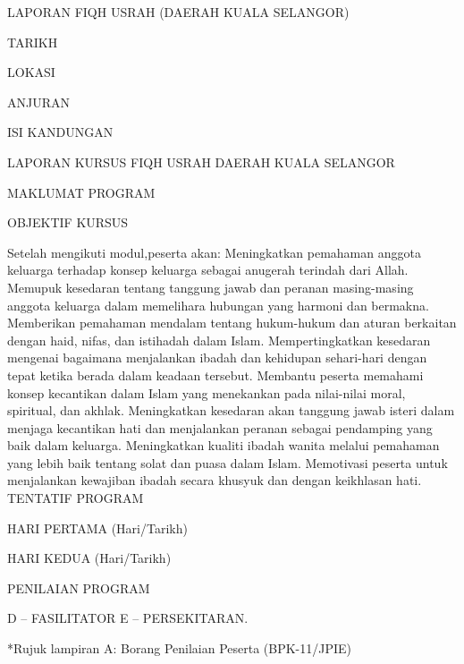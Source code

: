 



LAPORAN FIQH USRAH
(DAERAH KUALA SELANGOR)


TARIKH







LOKASI



ANJURAN

ISI KANDUNGAN


LAPORAN KURSUS FIQH USRAH DAERAH KUALA SELANGOR

MAKLUMAT PROGRAM





OBJEKTIF KURSUS



Setelah mengikuti modul,peserta akan:
Meningkatkan pemahaman anggota keluarga terhadap konsep keluarga sebagai anugerah terindah dari Allah.
Memupuk kesedaran tentang tanggung jawab dan peranan masing-masing anggota keluarga dalam memelihara hubungan yang harmoni dan bermakna.
Memberikan pemahaman mendalam tentang hukum-hukum dan aturan berkaitan dengan haid, nifas, dan istihadah dalam Islam.
Mempertingkatkan kesedaran mengenai bagaimana menjalankan ibadah dan kehidupan sehari-hari dengan tepat ketika berada dalam keadaan tersebut.
Membantu peserta memahami konsep kecantikan dalam Islam yang menekankan pada nilai-nilai moral, spiritual, dan akhlak.
Meningkatkan kesedaran akan tanggung jawab isteri dalam menjaga kecantikan hati dan menjalankan peranan sebagai pendamping yang baik dalam keluarga.
Meningkatkan kualiti ibadah wanita melalui pemahaman yang lebih baik tentang solat dan puasa dalam Islam.
Memotivasi peserta untuk menjalankan kewajiban ibadah secara khusyuk dan dengan keikhlasan hati.
TENTATIF PROGRAM


HARI PERTAMA (Hari/Tarikh)












HARI KEDUA (Hari/Tarikh)






PENILAIAN PROGRAM


D – FASILITATOR
E – PERSEKITARAN.


*Rujuk lampiran A: Borang Penilaian Peserta (BPK-11/JPIE)

